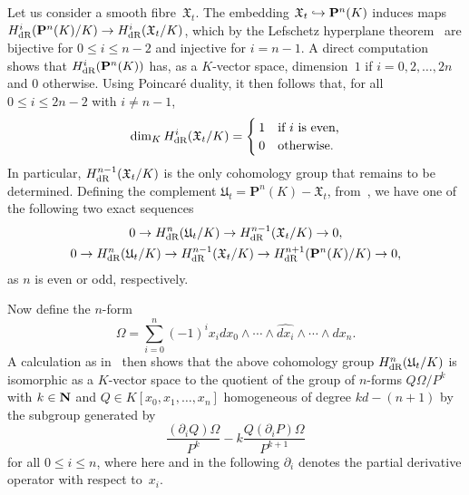 
Let us consider a smooth fibre~$\mathfrak{X}_t$.  The embedding 
$\mathfrak{X}_t \hookrightarrow \mathbf{P}^n(K)$ induces maps 
$H_{\text{dR}}^i(\mathbf{P}^n(K)/K) \rightarrow H_{\text{dR}}^i(\mathfrak{X}_t/K)$, which 
by the Lefschetz hyperplane theorem~\citep[\S 1.2, p.\ 156]{GriffithsHarris1978} 
are bijective for $0 \leq i \leq n-2$ and injective for $i = n-1$.  A direct 
computation~\citep[Corollary~3.1.4]{AbbottKedlayaRoe2006} shows that 
$H_{\text{dR}}^i(\mathbf{P}^n(K))$ has, as a $K$-vector space, dimension~$1$ if 
$i = 0, 2, \dotsc, 2n$ and $0$ otherwise.  Using Poincar\'e duality, it then 
follows that, for all $0 \leq i \leq 2n-2$ with $i \neq n-1$, 
\begin{equation}
\dim_K H_{\text{dR}}^i(\mathfrak{X}_t/K) = \begin{cases} 1 & \text{if $i$ is even,} \\ 
                                    0 & \text{otherwise.} \end{cases}
\end{equation}
In particular, $H_{\text{dR}}^{n-1}(\mathfrak{X}_t/K)$ is the only 
cohomology group that remains to be determined.  Defining the complement 
$\mathfrak{U}_t = \mathbf{P}^n(K) - \mathfrak{X}_t$, 
from~\citep[(10.16)]{Griffiths1969}, we have one of the following two exact 
sequences
\begin{gather}
0 \rightarrow H_{\text{dR}}^n(\mathfrak{U}_t/K) \rightarrow H_{\text{dR}}^{n-1}(\mathfrak{X}_t/K) \rightarrow 0, \\
0 \rightarrow H_{\text{dR}}^n(\mathfrak{U}_t/K) \rightarrow H_{\text{dR}}^{n-1}(\mathfrak{X}_t/K) \rightarrow H_{\text{dR}}^{n+1}(\mathbf{P}^n(K)/K) \rightarrow 0,
\end{gather}
as $n$ is even or odd, respectively.

Now define the $n$-form 
\begin{equation}
\Omega = \sum_{i=0}^n (-1)^i x_i d x_0 \wedge \dotsb \wedge \widehat{d x_i} \wedge \dotsb \wedge d x_n.
\end{equation}
A calculation as in~\citep[\S 4]{Griffiths1969} then shows that the 
above cohomology group $H_{\text{dR}}^n(\mathfrak{U}_t/K)$ is isomorphic as a 
$K$-vector space to the quotient of the group of $n$-forms $Q \Omega / P^k$ 
with $k \in \mathbf{N}$ and $Q \in K[x_0, x_1, \dotsc, x_n]$ homogeneous of degree 
$k d - (n + 1)$ by the subgroup generated by 
\begin{equation} \label{eq:PoleReductionQuotient}
\frac{(\partial_i Q) \Omega}{P^k} - k \frac{Q (\partial_i P) \Omega}{P^{k+1}}
\end{equation}
for all $0 \leq i \leq n$, where here and in the following $\partial_i$ 
denotes the partial derivative operator with respect to~$x_i$.

